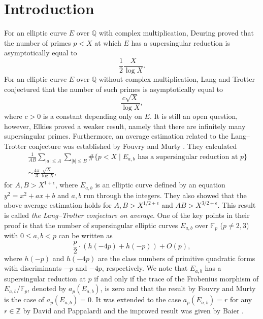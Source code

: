 \documentclass[a4paper, 11pt]{article}
\theoremstyle{plain}
\newcommand{\?}{\textcolor{red}{??}}
\newcommand{\fp}{\mathbb{F}_p}
\newcommand{\bZ}{\mathbb{Z}}
\begin{document}
\section{Introduction}
For an elliptic curve $E$ over $\mathbb{Q}$ with complex multiplication, Deuring proved that the number of primes $p <X$ at which $E$ has a supersingular reduction is asymptotically equal to 
 \[
 \frac{1}{2} \frac{X}{\log X}.
 \]
 For an elliptic curve $E$ over $\mathbb{Q}$ without complex multiplication, Lang and Trotter conjectured that the number of such primes is asymptotically equal to 
 \[\frac{c\sqrt{X}}{\log X},\]
 where $c>0$ is a constant depending only on $E$. It is still an open question, however,  Elkies \cite{Elkies} proved a weaker result, namely that there are infinitely many supersingular primes. Furthermore, an average estimation related to the Lang--Trotter conjecture was established by Fouvry and Murty \cite{FM01}.  They calculated 
 \begin{eqnarray*}
    && \frac{1}{AB} \sum_{\lvert a \rvert \le A} \sum_{\lvert b \rvert \le B}  \#\{p<X\mid E_{a,b} \textrm{ has a supersingular reduction at } p\}\\
    &&\sim \frac{4 \pi}{3} \frac{\sqrt{X}}{\log X},
 \end{eqnarray*}
for $A,B > X^{1+ \epsilon}$, where $E_{a,b}$ is an elliptic curve defined by an equation $y^2=x^2+ax+b$ and $a,b$ run through the integers. They also showed that the above average estimation holds for $A,B > X^{1/2+ \epsilon}$ and $AB > X^{3/2 +\epsilon}$. This result is called \textit{the Lang--Trotter conjecture on average}. One of the key \textcolor{black}{points} in their proof is that the number of supersingular elliptic curves $E_{a,b}$ over $\fp$ ($p \neq2,3$) with $0 \le a,b < p $ can be written as
\[
\frac{p}{2} \cdot \left(h(-4p)+h(-p) \right)+O(p),
\]
where $h(-p)$ and $h(-4p)$ are the class numbers of primitive quadratic forms with discriminants $-p$ and $-4p$, respectively. We note that $E_{a,b}$ has a supersingular reduction at $p$ if and only if the trace of the Frobenius morphism of $E_{a,b}/\fp$, denoted by $a_p(E_{a,b})$, is zero and that the result by Fouvry and Murty is the case of $a_p(E_{a,b})=0$. It was extended to the case $a_p(E_{a,b})=r$ for any $r\in \bZ$ by David and Pappalardi \cite{DP} and the improved result was given by Baier \cite{SB}. 
\end{document}
